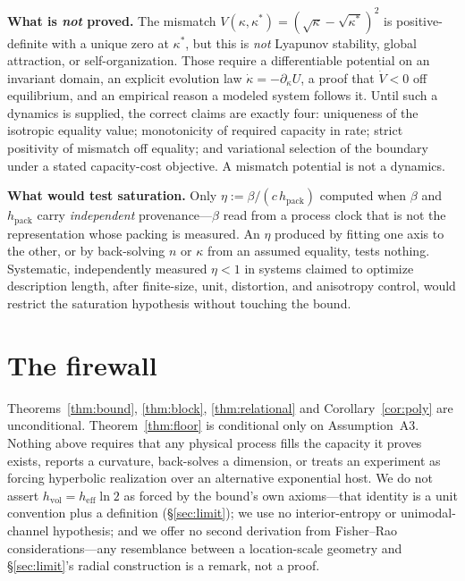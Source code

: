 \documentclass[11pt,reqno]{amsart}
\theoremstyle{plain}
\theoremstyle{definition}
\newcommand{\hpack}{h_{\mathrm{pack}}}
\newcommand{\hvol}{h_{\mathrm{vol}}}
\newcommand{\heff}{h_{\mathrm{eff}}}
\begin{document}
\medskip
\noindent\textbf{What is \emph{not} proved.} The mismatch $V(\kappa,\kappa^*)=(\sqrt\kappa-\sqrt{\kappa^*})^2$ is positive-definite with a unique zero at $\kappa^*$, but this is \emph{not} Lyapunov stability, global attraction, or self-organization. Those require a differentiable potential on an invariant domain, an explicit evolution law $\dot\kappa=-\partial_\kappa U$, a proof that $\dot V<0$ off equilibrium, and an empirical reason a modeled system follows it. Until such a dynamics is supplied, the correct claims are exactly four: uniqueness of the isotropic equality value; monotonicity of required capacity in rate; strict positivity of mismatch off equality; and variational selection of the boundary under a stated capacity-cost objective. A mismatch potential is not a dynamics.

\medskip
\noindent\textbf{What would test saturation.} Only $\eta:=\beta/(c\,\hpack)$ computed when $\beta$ and $\hpack$ carry \emph{independent} provenance---$\beta$ read from a process clock that is not the representation whose packing is measured. An $\eta$ produced by fitting one axis to the other, or by back-solving $n$ or $\kappa$ from an assumed equality, tests nothing. Systematic, independently measured $\eta<1$ in systems claimed to optimize description length, after finite-size, unit, distortion, and anisotropy control, would restrict the saturation hypothesis without touching the bound.

\section{The firewall}\label{sec:firewall}

Theorems~\ref{thm:bound}, \ref{thm:block}, \ref{thm:relational} and Corollary~\ref{cor:poly} are unconditional. Theorem~\ref{thm:floor} is conditional only on Assumption~A3. Nothing above requires that any physical process fills the capacity it proves exists, reports a curvature, back-solves a dimension, or treats an experiment as forcing hyperbolic realization over an alternative exponential host. We do not assert $\hvol=\heff\ln2$ as forced by the bound's own axioms---that identity is a unit convention plus a definition (\S\ref{sec:limit}); we use no interior-entropy or unimodal-channel hypothesis; and we offer no second derivation from Fisher--Rao considerations---any resemblance between a location-scale geometry and \S\ref{sec:limit}'s radial construction is a remark, not a proof.
\end{document}
